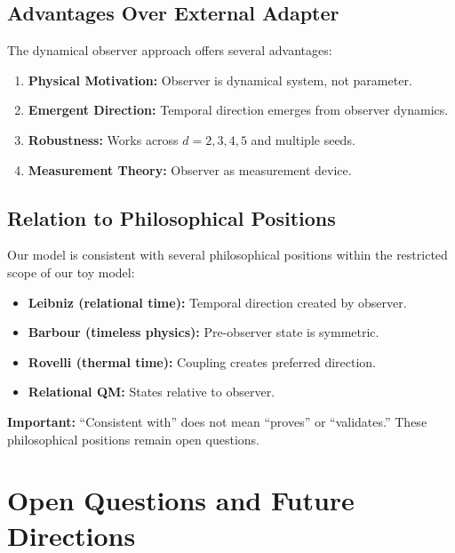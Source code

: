 \documentclass[12pt,a4paper]{article}
\begin{document}
\subsection{Advantages Over External Adapter}

The dynamical observer approach offers several advantages:

\begin{enumerate}[leftmargin=*]
\item \textbf{Physical Motivation:} Observer is dynamical system, not parameter.
\item \textbf{Emergent Direction:} Temporal direction emerges from observer dynamics.
\item \textbf{Robustness:} Works across $d = 2,3,4,5$ and multiple seeds.
\item \textbf{Measurement Theory:} Observer as measurement device.
\end{enumerate}

\subsection{Relation to Philosophical Positions}

Our model is consistent with several philosophical positions within the 
restricted scope of our toy model:

\begin{itemize}[leftmargin=*]
\item \textbf{Leibniz (relational time):} Temporal direction created by observer.
\item \textbf{Barbour (timeless physics):} Pre-observer state is symmetric.
\item \textbf{Rovelli (thermal time):} Coupling creates preferred direction.
\item \textbf{Relational QM:} States relative to observer.
\end{itemize}

\textbf{Important:} ``Consistent with'' does not mean ``proves'' or 
``validates.'' These philosophical positions remain open questions.

\section{Open Questions and Future Directions}\label{sec:open_questions}
\end{document}
